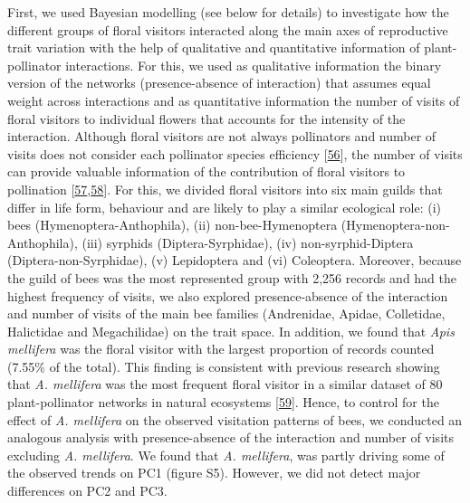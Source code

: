 \documentclass[
  12pt,
  a4paper,
]{article}
\begin{document}
First, we used Bayesian modelling (see below for details) to investigate how the different groups of floral visitors interacted along the main axes of reproductive trait variation with the help of qualitative and quantitative information of plant-pollinator interactions. For this, we used as qualitative information the binary version of the networks (presence-absence of interaction) that assumes equal weight across interactions and as quantitative information the number of visits of floral visitors to individual flowers that accounts for the intensity of the interaction. Although floral visitors are not always pollinators and number of visits does not consider each pollinator species efficiency {[}\protect\hyperlink{ref-ballantyne2015}{56}{]}, the number of visits can provide valuable information of the contribution of floral visitors to pollination {[}\protect\hyperlink{ref-vazquez2005}{57},\protect\hyperlink{ref-vazquez2012}{58}{]}. For this, we divided floral visitors into six main guilds that differ in life form, behaviour and are likely to play a similar ecological role: (i) bees (Hymenoptera-Anthophila), (ii) non-bee-Hymenoptera (Hymenoptera-non-Anthophila), (iii) syrphids (Diptera-Syrphidae), (iv) non-syrphid-Diptera (Diptera-non-Syrphidae), (v) Lepidoptera and (vi) Coleoptera. Moreover, because the guild of bees was the most represented group with 2,256 records and had the highest frequency of visits, we also explored presence-absence of the interaction and number of visits of the main bee families (Andrenidae, Apidae, Colletidae, Halictidae and Megachilidae) on the trait space. In addition, we found that \emph{Apis mellifera} was the floral visitor with the largest proportion of records counted (7.55\% of the total). This finding is consistent with previous research showing that \emph{A. mellifera} was the most frequent floral visitor in a similar dataset of 80 plant-pollinator networks in natural ecosystems {[}\protect\hyperlink{ref-hung2018}{59}{]}. Hence, to control for the effect of \emph{A. mellifera} on the observed visitation patterns of bees, we conducted an analogous analysis with presence-absence of the interaction and number of visits excluding \emph{A. mellifera}. We found that \emph{A. mellifera}, was partly driving some of the observed trends on PC1 (figure S5). However, we did not detect major differences on PC2 and PC3.
\end{document}
